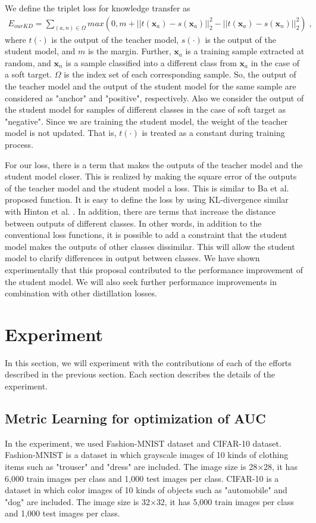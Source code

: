 \documentclass[a4paper,12pt]{article}
\begin{document}
We define the triplet loss for knowledge transfer as
\begin{align}
    E_{ourKD} = \sum_{(a,n) \in \Omega} max(0, m + ||t({\bm x_a}) - s({\bm x_a})||_2^2 - ||t({\bm x_a}) - s({\bm x_n})||_2^2) \; ,
\end{align}
where $t(\cdot)$ is the output of the teacher model, $s(\cdot)$ is the output of the student model, and $m$ is the margin.
Further, ${\bm x_a}$ is a training sample extracted at random, and ${\bm x_n}$ is a sample classified into a different class from ${\bm x_a}$ in the case of a soft target.
$\Omega$ is the index set of each corresponding sample.
So, the output of the teacher model and the output of the student model for the same sample are considered as "anchor" and "positive", respectively.
Also we consider the output of the student model for samples of different classes in the case of soft target as "negative".
Since we are training the student model, the weight of the teacher model is not updated.
That is, $t(\cdot)$ is treated as a constant during training process.

For our loss, there is a term that makes the outputs of the teacher model and the student model closer. 
This is realized by making the square error of the outputs of the teacher model and the student model a loss.
This is similar to Ba et al. \cite{Ba2014} proposed function.
It is easy to define the loss by using KL-divergence similar with Hinton et al. \cite{Hinton2015}.
In addition, there are terms that increase the distance between outputs of different classes.
In other words, in addition to the conventional loss functions, it is possible to add a constraint that the student model makes the outputs of other classes dissimilar.
This will allow the student model to clarify differences in output between classes.
We have shown experimentally that this proposal contributed to the performance improvement of the student model.
We will also seek further performance improvements in combination with other distillation losses.

\section{Experiment}
In this section, we will experiment with the contributions of each of the efforts described in the previous section.
Each section describes the details of the experiment.
\subsection{Metric Learning for optimization of AUC}
In the experiment, we used Fashion-MNIST dataset and CIFAR-10 dataset.
Fashion-MNIST is a dataset in which grayscale images of 10 kinds of clothing items such as "trouser" and "dress" are included.
The image size is 28$\times$28, it has 6,000 train images per class and 1,000 test images per class.
CIFAR-10 is a dataset in which color images of 10 kinds of objects such as "automobile" and "dog" are included.
The image size is 32$\times$32, it has 5,000 train images per class and 1,000 test images per class.
\end{document}
